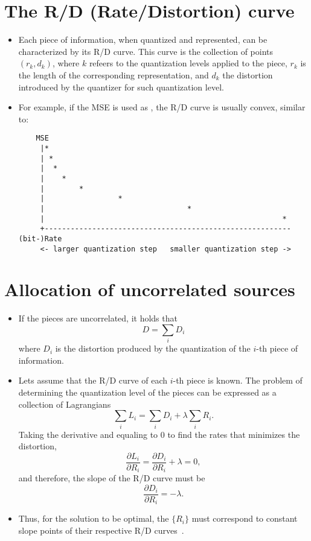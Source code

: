 \section{The R/D (Rate/Distortion) curve}
\begin{itemize}
\item 
  Each piece of information, when quantized and represented, can be
  characterized by its R/D curve. This curve is the collection of
  points $(r_k,d_k)$, where $k$ refeers to the quantization levels
  applied to the piece, $r_k$ is the length of the corresponding
  representation, and $d_k$ the distortion introduced by the quantizer
  for such quantization level.
\item
  For example, if the MSE is used as
  , the R/D curve is
  usually convex, similar to:
\begin{verbatim}
    MSE
     |*
     | *
     |  *
     |    *
     |        *
     |                 *
     |                                 *
     |                                                       *
     +--------------------------------------------------------- (bit-)Rate
     <- larger quantization step   smaller quantization step ->
\end{verbatim}
\end{itemize}

\section{Allocation of uncorrelated sources}
\begin{itemize}

\item
  If the pieces are uncorrelated, it holds that
  \begin{equation}
    D=\sum_i D_i
  \end{equation}
  where $D_i$ is the distortion produced by the quantization of the
  $i$-th piece of information.

\item
  Lets assume that the R/D curve of each $i$-th piece is known. The
  problem of determining the quantization level of the pieces can be
  expressed as a collection of Lagrangians
  \begin{equation}
    \sum_i L_i = \sum_i D_i + \lambda\sum_i R_i.
  \end{equation}
  Taking the derivative and equaling to $0$ to find the rates that minimizes the distortion,
  \begin{equation*}
    \frac{\partial L_i}{\partial R_i} = \frac{\partial D_i}{\partial R_i} + \lambda = 0,
  \end{equation*}
  and therefore, the slope of the R/D curve must be
  \begin{equation}
    \frac{\partial D_i}{\partial R_i} = -\lambda.
  \end{equation}

\item 
  Thus, for the solution to be optimal, the $\{R_i\}$ must correspond
  to constant slope points of their respective R/D
  curves~\cite{vetterli1995wavelets}.

\end{itemize}
  
